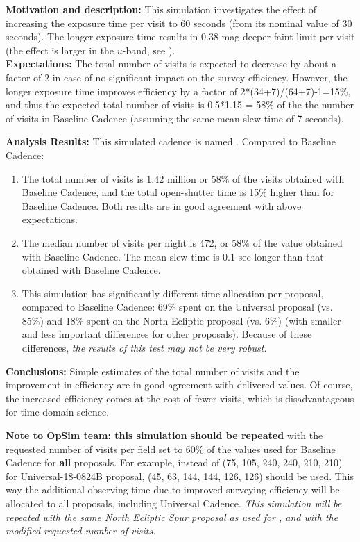 
{\bf Motivation and description:} This simulation investigates the
effect of increasing the exposure time per visit to 60 seconds (from
its nominal value of 30 seconds). The longer exposure time results in
0.38 mag deeper faint limit per visit (the effect is larger in the
$u$-band, see ). \\

{\bf Expectations:} The total number of visits is expected to decrease
by about a factor of 2 in case of no significant impact on the survey
efficiency. However, the longer exposure time improves efficiency by a
factor of 2*(34+7)/(64+7)-1=15\%, and thus the expected total number
of visits is 0.5*1.15 = 58\% of the the number of visits in Baseline
Cadence (assuming the same mean slew time of 7 seconds).

{\bf Analysis Results:} This simulated cadence is named .
Compared to Baseline Cadence:
\begin{enumerate}
\item The total number of visits is 1.42 million or 58\% of the visits
obtained with Baseline Cadence, and the total open-shutter time is
15\% higher than for Baseline Cadence. Both results are in good
agreement with above expectations.
\item The median number of visits per night is 472, or 58\% of the
value obtained with Baseline Cadence. The mean slew time is 0.1 sec
longer than that obtained with Baseline Cadence.
\item This simulation has significantly different time allocation per
proposal, compared to Baseline Cadence: 69\% spent on the Universal
proposal (vs. 85\%) and 18\%  spent on the North Ecliptic proposal
(vs. 6\%)  (with smaller and less important differences for other
proposals). Because of these differences, {\it the results of this
test may not be very robust.}
\end{enumerate}

{\bf Conclusions:}
Simple estimates of the total number of visits and the improvement in
efficiency are in good agreement with delivered values. Of course, the
increased efficiency comes at the cost of fewer visits, which is
disadvantageous for time-domain science.

{\bf Note to OpSim team: this simulation should be repeated} with the
requested number of visits per field set to 60\% of the values used
for Baseline Cadence for {\bf all} proposals. For example, instead of
(75, 105, 240, 240, 210, 210) for Universal-18-0824B proposal, (45,
63, 144, 144, 126, 126) should be used.  This way the additional
observing time due to improved surveying efficiency will be allocated
to all proposals, including Universal Cadence. {\it This simulation
will be repeated with the same North Ecliptic Spur proposal as used
for , and with the modified requested number of
visits.}


